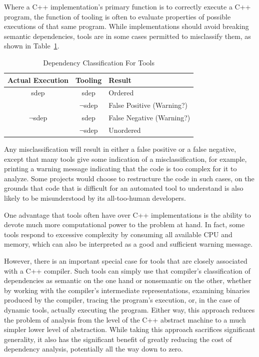 \documentclass[10]{article}
\begin{document}
Where a C++ implementation's primary function is to correctly execute
a C++ program, the function of tooling is often to evaluate properties
of possible executions of that same program.
While implementations should avoid breaking semantic dependencies,
tools are in some cases permitted to misclassify them, as shown in
Table~\ref{tab:Dependency Classification For Tools}.

\begin{table}
\centering
\begin{tabular}{c|c|l}
Actual Execution	& Tooling		& Result \\
\hline
sdep			& sdep			& Ordered \\
\cline{2-3}
			& $\neg$sdep		& False Positive (Warning?) \\
\hline
$\neg$sdep		& sdep			& False Negative (Warning?) \\
\cline{2-3}
			& $\neg$sdep		& Unordered \\
\end{tabular}
\caption{Dependency Classification For Tools}
\label{tab:Dependency Classification For Tools}
\end{table}

Any misclassification will result in either a false positive or
a false negative, except that many tools give some indication of a
misclassification, for example, printing a warning message indicating
that the code is too complex for it to analyze.
Some projects would choose to restructure the code in such cases, on the
grounds that code that is difficult for an automated tool to understand
is also likely to be misunderstood by its all-too-human developers.

One advantage that tools often have over C++ implementations is the
ability to devote much more computational power to the problem at hand.
In fact, some tools respond to excessive complexity by consuming all
available CPU and memory, which can also be interpreted as a good and
sufficient warning message.

However, there is an important special case for tools that are closely
associated with a C++ compiler.
Such tools can simply use that compiler's classification of
dependencies as semantic on the one hand or nonsemantic on the
other, whether by working with the compiler's intermediate
representations, examining binaries produced by the compiler, tracing
the program's execution, or, in the case of dynamic tools, actually
executing the program.
Either way, this approach reduces the problem of analysis from the
level of the C++ abstract machine to a much simpler lower level of
abstraction.
While taking this approach sacrifices significant generality, it also
has the significant benefit of greatly reducing the cost of dependency
analysis, potentially all the way down to zero.
\end{document}
